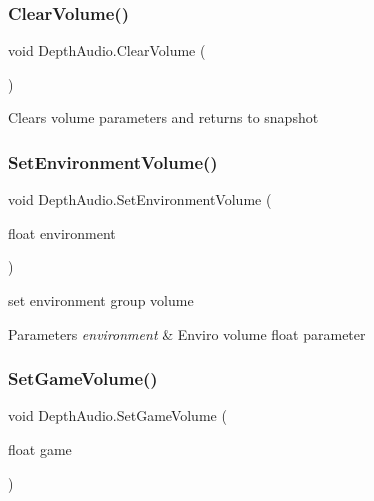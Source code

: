 \mbox{\label{class_depth_audio_a8609f22cfa403faa76be601fcfacad05}} 
\subsubsection{\texorpdfstring{Clear\+Volume()}{ClearVolume()}}
{\footnotesize\ttfamily void Depth\+Audio.\+Clear\+Volume (\begin{DoxyParamCaption}{ }\end{DoxyParamCaption})}



Clears volume parameters and returns to snapshot 

\mbox{\label{class_depth_audio_a48a2f99259fd6c1e7a02e9b336bf0ce5}} 
\subsubsection{\texorpdfstring{Set\+Environment\+Volume()}{SetEnvironmentVolume()}}
{\footnotesize\ttfamily void Depth\+Audio.\+Set\+Environment\+Volume (\begin{DoxyParamCaption}\item[{float}]{environment }\end{DoxyParamCaption})}



set environment group volume 
\begin{DoxyParams}{Parameters}
{\em environment} & Enviro volume float parameter\\
\hline
\end{DoxyParams}


\mbox{\label{class_depth_audio_a641bf7c342dbbd04aca32b68fb526b23}} 
\subsubsection{\texorpdfstring{Set\+Game\+Volume()}{SetGameVolume()}}
{\footnotesize\ttfamily void Depth\+Audio.\+Set\+Game\+Volume (\begin{DoxyParamCaption}\item[{float}]{game }\end{DoxyParamCaption})}




